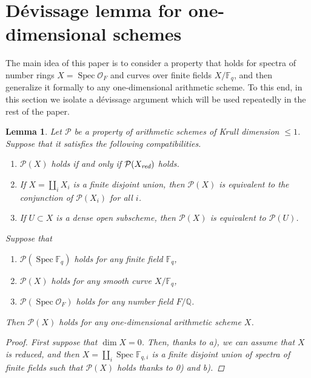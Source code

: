 \documentclass[draft]{article}
\DeclareMathOperator{\Spec}{Spec}
\newcommand{\FF}{\mathbb{F}}
\newcommand{\QQ}{\mathbb{Q}}
\newcommand{\red}{\text{\it red}}
\theoremstyle{myplain}
\newtheorem{lemma}[theorem]{Lemma}
\theoremstyle{mydefinition}
\begin{document}
\section{D\'{e}vissage lemma for one-dimensional schemes}
\label{sec:devissage}

The main idea of this paper is to consider a property that holds for spectra of
number rings $X = \Spec \mathcal{O}_F$ and curves over finite fields $X/\FF_q$,
and then generalize it formally to any one-dimensional arithmetic scheme.
To this end, in this section we isolate a d\'{e}vissage argument which will be
used repeatedly in the rest of the paper.

\begin{lemma}
  \label{lemma:devissage}
  Let $\mathcal{P}$ be a property of arithmetic schemes of Krull dimension
  $\le 1$. Suppose that it satisfies the following compatibilities.
  \begin{enumerate}
  \item[a)] $\mathcal{P} (X)$ holds if and only if $\mathcal{P} (X_\red)$ holds.

  \item[b)] If $X = \coprod_i X_i$ is a finite disjoint union, then
    $\mathcal{P} (X)$ is equivalent to the conjunction of $\mathcal{P} (X_i)$ for
    all $i$.

  \item[c)] If $U \subset X$ is a dense open subscheme, then $\mathcal{P} (X)$
    is equivalent to $\mathcal{P} (U)$.
  \end{enumerate}
  Suppose that
  \begin{enumerate}
  \item[0)] $\mathcal{P} (\Spec \FF_q)$ holds for any finite field $\FF_q$,

  \item[1)] $\mathcal{P} (X)$ holds for any smooth curve $X/\FF_q$,

  \item[2)] $\mathcal{P} (\Spec \mathcal{O}_F)$ holds for any number field
    $F/\QQ$.
  \end{enumerate}
  Then $\mathcal{P} (X)$ holds for any one-dimensional arithmetic scheme $X$.

  \begin{proof}
    First suppose that $\dim X = 0$. Then, thanks to a), we can assume that $X$
    is reduced, and then $X = \coprod_i \Spec \FF_{q,i}$ is a finite disjoint
    union of spectra of finite fields such that $\mathcal{P} (X)$ holds thanks
    to 0) and b).


\end{proof}
\end{lemma}
\end{document}
